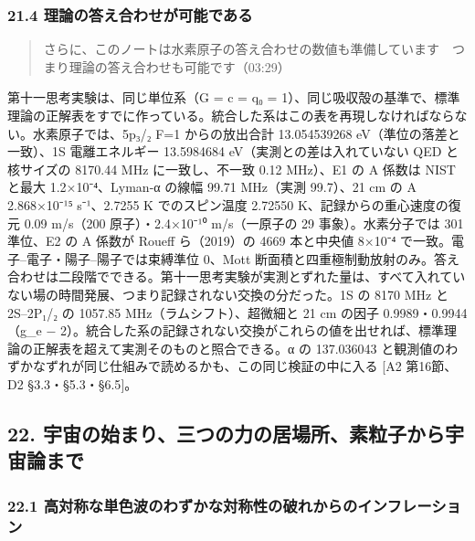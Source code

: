 \documentclass[
  a4paper,
]{ltjsarticle}
\begin{document}
\subsubsection{21.4
理論の答え合わせが可能である}\label{ux7406ux8ad6ux306eux7b54ux3048ux5408ux308fux305bux304cux53efux80fdux3067ux3042ux308b}

\begin{quote}
さらに、このノートは水素原子の答え合わせの数値も準備しています　つまり理論の答え合わせも可能です（03:29）
\end{quote}

第十一思考実験は、同じ単位系（G = c = q₀ =
1）、同じ吸収殻の基準で、標準理論の正解表をすでに作っている。統合した系はこの表を再現しなければならない。水素原子では、5p₃/₂
F=1 からの放出合計 13.054539268 eV（準位の落差と一致）、1S
電離エネルギー 13.5984684 eV（実測との差は入れていない QED と核サイズの
8170.44 MHz に一致し、不一致 0.12 MHz）、E1 の A 係数は NIST と最大
1.2×10⁻⁴、Lyman-α の線幅 99.71 MHz（実測 99.7）、21 cm の A 2.868×10⁻¹⁵
s⁻¹、2.7255 K でのスピン温度 2.72550 K、記録からの重心速度の復元 0.09
m/s（200 原子）・2.4×10⁻¹⁰ m/s（一原子の 29 事象）。水素分子では 301
準位、E2 の A 係数が Roueff ら（2019）の 4669 本と中央値 8×10⁻⁴
で一致。電子--電子・陽子--陽子では束縛準位 0、Mott
断面積と四重極制動放射のみ。答え合わせは二段階でできる。第十一思考実験が実測とずれた量は、すべて入れていない場の時間発展、つまり記録されない交換の分だった。1S
の 8170 MHz と 2S--2P₁/₂ の 1057.85 MHz（ラムシフト）、超微細と 21 cm
の因子 0.9989・0.9944（g\_e −
2）。統合した系の記録されない交換がこれらの値を出せれば、標準理論の正解表を超えて実測そのものと照合できる。α
の 137.036043
と観測値のわずかなずれが同じ仕組みで読めるかも、この同じ検証の中に入る
{[}A2 第16節、D2 §3.3・§5.3・§6.5{]}。

\subsection{22.
宇宙の始まり、三つの力の居場所、素粒子から宇宙論まで}\label{ux5b87ux5b99ux306eux59cbux307eux308aux4e09ux3064ux306eux529bux306eux5c45ux5834ux6240ux7d20ux7c92ux5b50ux304bux3089ux5b87ux5b99ux8ad6ux307eux3067}

\subsubsection{22.1
高対称な単色波のわずかな対称性の破れからのインフレーション}\label{ux9ad8ux5bfeux79f0ux306aux5358ux8272ux6ce2ux306eux308fux305aux304bux306aux5bfeux79f0ux6027ux306eux7834ux308cux304bux3089ux306eux30a4ux30f3ux30d5ux30ecux30fcux30b7ux30e7ux30f3}
\end{document}
